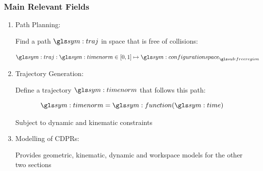 \documentclass{beamer}
\begin{document}
	\begin{frame}
		\frametitle{Main Relevant Fields}

		\begin{enumerate}

			\item

				Path Planning:

				Find a path $\pathsym$ in space that is free of collisions:

				\begin{equation}
					\pathsym : \timenorm \in [0, 1] \mapsto \configurationspace_{\freeregion}
				\end{equation}


			\item

				Trajectory Generation:

				Define a trajectory $\timenorm$ that follows this path:

				\begin{equation}
					\timenorm = \function(\timesym)
				\end{equation}

				Subject to dynamic and kinematic constraints

			\item

				Modelling of CDPRs:

				Provides geometric, kinematic, dynamic and workspace models for
				the other two sections

		\end{enumerate}
	\end{frame}


\end{document}
